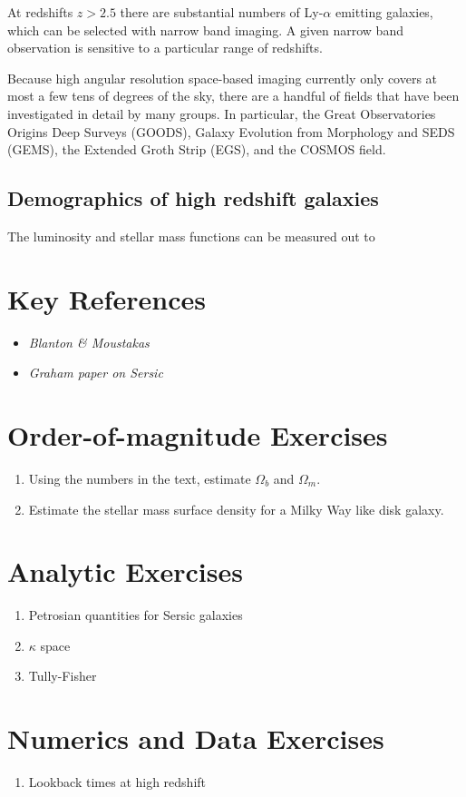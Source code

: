 At redshifts $z>2.5$ there are substantial numbers of Ly-$\alpha$
emitting galaxies, which can be selected with narrow band imaging. A
given narrow band observation is sensitive to a particular range of
redshifts. 

Because high angular resolution space-based imaging currently only
covers at most a few tens of degrees of the sky, there are a handful
of fields that have been investigated in detail by many groups. In
particular, the Great Observatories Origins Deep Surveys (GOODS),
Galaxy Evolution from Morphology and SEDS (GEMS), the Extended Groth
Strip (EGS), and the COSMOS field.

\subsection{Demographics of high redshift galaxies}

The luminosity and stellar mass functions can be measured out to 



\section{Key References}

\begin{itemize}
  \item
    {\it Blanton \& Moustakas}
  \item
    {\it Graham paper on Sersic}
\end{itemize}

\citet{gunn06a}

\section{Order-of-magnitude Exercises}

\begin{enumerate} 
\item Using the numbers in the text, estimate $\Omega_b$ and
    $\Omega_m$. 
\item Estimate the stellar mass surface density for a Milky Way like
disk galaxy.
\end{enumerate} 

\section{Analytic Exercises}

\begin{enumerate}
\item Petrosian quantities for Sersic galaxies
\item $\kappa$ space
\item Tully-Fisher
\end{enumerate}

\section{Numerics and Data Exercises}

\begin{enumerate}
\item Lookback times at high redshift
\end{enumerate}


  
